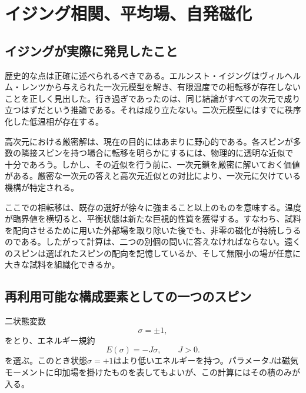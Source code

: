 \chapter{イジング相関、平均場、自発磁化}


\section{イジングが実際に発見したこと}

歴史的な点は正確に述べられるべきである。エルンスト・イジングはヴィルヘルム・レンツから与えられた一次元模型を解き、有限温度での相転移が存在しないことを正しく見出した。行き過ぎであったのは、同じ結論がすべての次元で成り立つはずだという推論である。それは成り立たない。二次元模型にはすでに秩序化した低温相が存在する。

高次元における厳密解は、現在の目的にはあまりに野心的である。各スピンが多数の隣接スピンを持つ場合に転移を明らかにするには、物理的に透明な近似で十分であろう。しかし、その近似を行う前に、一次元鎖を厳密に解いておく価値がある。厳密な一次元の答えと高次元近似との対比により、一次元に欠けている機構が特定される。

ここでの相転移は、既存の選好が徐々に強まること以上のものを意味する。温度が臨界値を横切ると、平衡状態は新たな巨視的性質を獲得する。すなわち、試料を配向させるために用いた外部場を取り除いた後でも、非零の磁化が持続しうるのである。したがって計算は、二つの別個の問いに答えなければならない。遠くのスピンは選ばれたスピンの配向を記憶しているか、そして無限小の場が任意に大きな試料を組織化できるか。

\section{再利用可能な構成要素としての一つのスピン}

二状態変数
\begin{equation}
\sigma=\pm1,
\end{equation}
をとり、エネルギー規約
\begin{equation}
E(\sigma)=-J\sigma,
\qquad J>0.
\end{equation}
を選ぶ。このとき状態\(\sigma=+1\)はより低いエネルギーを持つ。パラメータ\(J\)は磁気モーメントに印加場を掛けたものを表してもよいが、この計算にはその積のみが入る。

